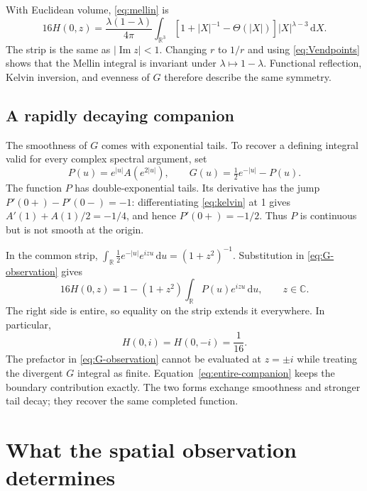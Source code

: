 \documentclass[11pt]{article}
\theoremstyle{remark}
\numberwithin{equation}{section}
\newcommand{\R}{\mathbb R}
\newcommand{\C}{\mathbb C}
\newcommand{\dd}{\,\mathrm d}
\begin{document}
With Euclidean volume, \eqref{eq:mellin} is
\begin{equation}\label{eq:mellin3d}
 16H(0,z)=\frac{\lambda(1-\lambda)}{4\pi}
 \int_{\R^3}[1+|X|^{-1}-\Theta(|X|)]|X|^{\lambda-3}\dd X.
\end{equation}
The strip is the same as \(|\operatorname{Im}z|<1\).
Changing \(r\) to \(1/r\) and using \eqref{eq:Vendpoints} shows
that the Mellin integral is invariant under
\(\lambda\mapsto1-\lambda\). Functional reflection, Kelvin inversion,
and evenness of \(G\) therefore describe the same symmetry.

\subsection{A rapidly decaying companion}

The smoothness of \(G\) comes with exponential tails. To recover a
defining integral valid for every complex spectral argument, set
\begin{equation}\label{eq:P}
 P(u)=e^{|u|}A(e^{2|u|}),\qquad
 G(u)=\tfrac12e^{-|u|}-P(u).
\end{equation}
The function \(P\) has double-exponential tails. Its derivative has
the jump \(P'(0+)-P'(0-)=-1\): differentiating \eqref{eq:kelvin}
at 1 gives \(A'(1)+A(1)/2=-1/4\), and hence \(P'(0+)=-1/2\).
Thus \(P\) is continuous but is not smooth at the origin.

In the common strip,
\(\int_{\R}\tfrac12e^{-|u|}e^{izu}\dd u=(1+z^2)^{-1}\).
Substitution in \eqref{eq:G-observation} gives
\begin{equation}\label{eq:entire-companion}
 \boxed{\displaystyle
 16H(0,z)=1-(1+z^2)\int_{\R}P(u)e^{izu}\dd u,
 \qquad z\in\C.}
\end{equation}
The right side is entire, so equality on the strip extends it everywhere.
In particular,
\begin{equation}\label{eq:endpoint}
 H(0,i)=H(0,-i)=\frac1{16}.
\end{equation}
The prefactor in \eqref{eq:G-observation} cannot be evaluated at
\(z=\pm i\) while treating the divergent \(G\) integral as finite.
Equation~\eqref{eq:entire-companion} keeps the boundary contribution
exactly. The two forms exchange smoothness and stronger tail decay;
they recover the same completed function.

\section{What the spatial observation determines}
\label{sec:information}
\end{document}

